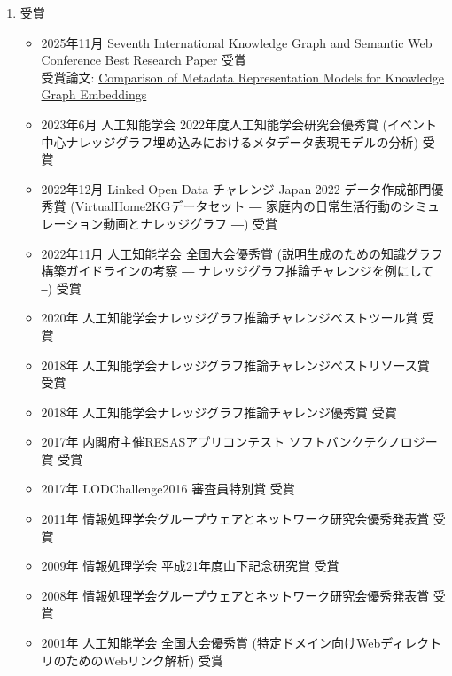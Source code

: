 \documentclass[dvipdfmx]{jlreq}
\begin{document}
\begin{enumerate}
\begin{itemize}
\item CollabTech(International Conference on Collaboration Technologies) 2009,2012 プログラム委員
\item KICSS(International Conference on Knowledge, Information and Creativity Support Systems) 2008 プログラム委員
\item CollabTech(International Conference on Collaboration Technologies) 2006,2008 実行委員
\item 2005年4月～2008年3月 情報処理学会グループウェアとネットワークサービス研究会幹事
\item ICDCS(International Conference on Distributed Computing Systems) 2004 実行委員
\item 2003年人工知能学会全国大会プログラム委員
\item 2001年4月～2005年3月 情報処理学会グループウェアとネットワークサービス研究会運営委員
\item 1995年4月～1996年7月 情報処理学会 情報規格調査会 FDT-SWG 委員
\end{itemize}
\item 受賞
\begin{itemize}
\item 2025年11月 Seventh International Knowledge Graph and Semantic Web Conference Best Research Paper 受賞\\
受賞論文: \href{https://doi.org/10.1007/978-3-032-13109-6_4}{Comparison of Metadata Representation Models for Knowledge Graph Embeddings}
\item 2023年6月 人工知能学会 2022年度人工知能学会研究会優秀賞 (イベント中心ナレッジグラフ埋め込みにおけるメタデータ表現モデルの分析) 受賞
\item 2022年12月 Linked Open Data チャレンジ Japan 2022 データ作成部門優秀賞 (VirtualHome2KGデータセット ― 家庭内の日常生活行動のシミュレーション動画とナレッジグラフ ―) 受賞
\item 2022年11月 人工知能学会 全国大会優秀賞 (説明生成のための知識グラフ構築ガイドラインの考察 ― ナレッジグラフ推論チャレンジを例にして ‒) 受賞
\item 2020年 人工知能学会ナレッジグラフ推論チャレンジベストツール賞 受賞
\item 2018年 人工知能学会ナレッジグラフ推論チャレンジベストリソース賞 受賞
\item 2018年 人工知能学会ナレッジグラフ推論チャレンジ優秀賞 受賞
\item 2017年 内閣府主催RESASアプリコンテスト ソフトバンクテクノロジー賞 受賞
\item 2017年 LODChallenge2016 審査員特別賞 受賞
\item 2011年 情報処理学会グループウェアとネットワーク研究会優秀発表賞 受賞
\item 2009年 情報処理学会 平成21年度山下記念研究賞 受賞
\item 2008年 情報処理学会グループウェアとネットワーク研究会優秀発表賞 受賞
\item 2001年 人工知能学会 全国大会優秀賞 (特定ドメイン向けWebディレクトリのためのWebリンク解析) 受賞
\end{itemize}
\end{enumerate}
\end{document}
